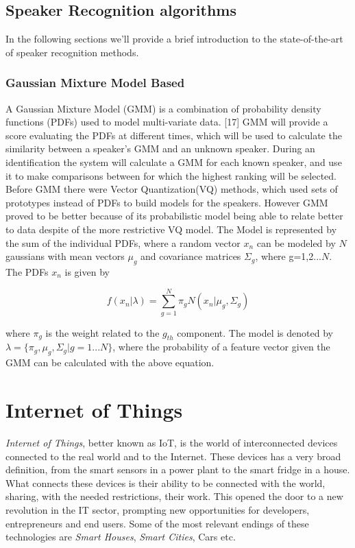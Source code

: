 \begin{itemize}
\begin{itemize}
\end{itemize}

\subsection{Speaker Recognition algorithms}

In the following sections we'll provide a brief introduction
to the state-of-the-art of speaker recognition methods.

\subsubsection{Gaussian Mixture Model Based}

A Gaussian Mixture Model (GMM) is a combination of probability
density functions (PDFs) used to model multi-variate data. [17]
GMM will provide a score evaluating the PDFs at different times, which
will be used to calculate the similarity between a speaker's GMM and an
unknown speaker. During an identification the system will calculate
a GMM for each known speaker, and use it to make comparisons between
for which the highest ranking will be selected.\\
Before GMM there were Vector Quantization(VQ) methods, which used
sets of prototypes instead of PDFs to build models for the speakers.
However GMM proved to be better because of its probabilistic model being
able to relate better to data despite of the more restrictive VQ model.
The Model is represented by the sum of the individual PDFs, where a random
vector $x_{n}$ can be modeled by $N$ gaussians with mean vectors $\mu_{g}$ and
covariance matrices $\Sigma_{g}$, where g=1,2...$N$. The PDFs $x_{n}$ is given by

\begin{equation}
    f(x_{n}|\lambda) = {\sum_{g=1}^N \pi_{g}N(x_{n}| \mu_{g}, \Sigma_{g})}
\end{equation}

where $\pi_{g}$ is the weight related to the $g_{th}$ component. The model
is denoted by $\lambda = \{ \pi_{g}, \mu_{g},\Sigma_{g}| g=1...N\}$, where the
probability of a feature vector given the GMM can be calculated with the above equation.



\section{Internet of Things}

\textit{Internet of Things}, better known as IoT, is the world of interconnected devices
connected to the real world and to the Internet. These devices has a very
broad definition, from the smart sensors in a power plant to the smart fridge in
a house. What connects these devices is their ability to be connected with the world,
sharing, with the needed restrictions, their work. This opened the door to a new
revolution in the IT sector, prompting new opportunities for developers, entrepreneurs
and end users. Some of the most relevant endings of these technologies are \textit{Smart Houses},
\textit{Smart Cities}, Cars etc. %


\end{itemize}
